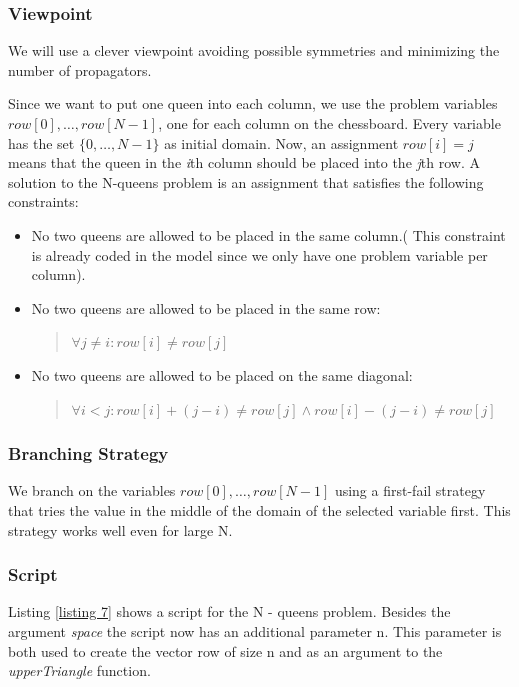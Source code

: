 \documentclass[a4paper,halfparskip]{scrartcl}
\begin{document}
\subsubsection{Viewpoint}
We will use a clever viewpoint avoiding possible symmetries and minimizing 
the number of propagators.

Since we want to put one queen into each column, we use the problem
variables $ row[ 0 ], \ldots, row[ N - 1 ]$, one for each column on
the chessboard. Every variable has the set $ \{ 0, \ldots, N - 1 \} $
as initial domain. Now, an assignment $ row[ i ] = j $ means that the
queen in the \emph{i}th column should be placed into the \emph{j}th row.
A solution to the N-queens problem is an assignment that satisfies the
following constraints:
\begin{itemize}
\item
No two queens are allowed to be placed in the same column.( This constraint
is already coded in the model since we only have one problem variable
per column).
\item
No two queens are allowed to be placed in the same row:
\begin{quote}
$ \forall j \neq i : row[ i ] \neq row[ j ] $
\end{quote}
\item
No two queens are allowed to be placed on the same diagonal:
\begin{quote}
$ \forall i < j : row[ i ] + (j - i) \neq row[ j ] \wedge  row[ i ] - (j - i) \neq row[ j ] $
\end{quote}
\end{itemize}

\subsubsection{Branching Strategy}
We branch on the variables $ row[ 0 ], \ldots, row[ N - 1 ]$ using a 
first-fail strategy that tries the value in the middle of the domain of 
the selected variable first. This strategy works well even for large N. 

\subsubsection{Script}
Listing \ref{listing 7} shows a script for the N - queens problem.
Besides the argument \emph{space} the script now has an additional
parameter n. This parameter is both used to create the vector row of
size n and as an argument to the \emph{upperTriangle} function.
\end{document}
